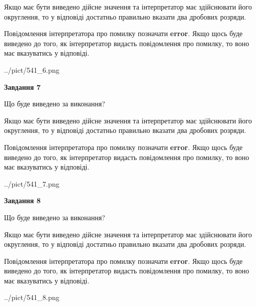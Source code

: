 \documentclass[12pt, ukrainian]{article}
\begin{document}
{\begin {Large}
Якщо має бути виведено дійсне значення та інтерпретатор має здійснювати його округлення, 
то у відповіді достатньо правильно вказати два дробових розряди.

Повідомлення інтерпретатора про помилку позначати \textbf{error}.
Якщо щось буде виведено до того, як інтерпретатор видасть повідомлення про помилку, 
то воно має вказуватись у відповіді. \par

\begin{center}
	{../pict/541_6.png}
\end{center}
\newpage

{\begin {center}\textbf{Завдання 7}\end {center}}\par
Що буде виведено за виконання? \par

Якщо має бути виведено дійсне значення та інтерпретатор має здійснювати його округлення, 
то у відповіді достатньо правильно вказати два дробових розряди.

Повідомлення інтерпретатора про помилку позначати \textbf{error}.
Якщо щось буде виведено до того, як інтерпретатор видасть повідомлення про помилку, 
то воно має вказуватись у відповіді. \par

\begin{center}
	{../pict/541_7.png}
\end{center}
\newpage

{\begin {center}\textbf{Завдання 8}\end {center}}\par
Що буде виведено за виконання? \par

Якщо має бути виведено дійсне значення та інтерпретатор має здійснювати його округлення, 
то у відповіді достатньо правильно вказати два дробових розряди.

Повідомлення інтерпретатора про помилку позначати \textbf{error}.
Якщо щось буде виведено до того, як інтерпретатор видасть повідомлення про помилку, 
то воно має вказуватись у відповіді. \par

\begin{center}
	{../pict/541_8.png}
\end{center}
\newpage


\end{Large}}
\end{document}
